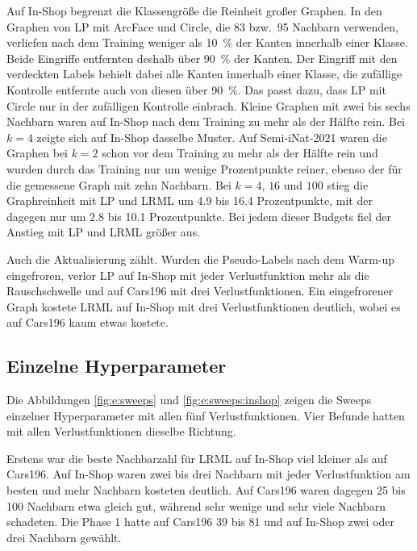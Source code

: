 Auf In-Shop begrenzt die Klassengröße die Reinheit großer Graphen. In den Graphen von \ac{LP} mit ArcFace und Circle, die 83 bzw.\ 95 Nachbarn verwenden, verliefen nach dem Training weniger als \qty{10}{\percent} der Kanten innerhalb einer Klasse. Beide Eingriffe entfernten deshalb über \qty{90}{\percent} der Kanten. Der Eingriff mit den verdeckten Labels behielt dabei alle Kanten innerhalb einer Klasse, die zufällige Kontrolle entfernte auch von diesen über \qty{90}{\percent}. Das passt dazu, dass \ac{LP} mit Circle nur in der zufälligen Kontrolle einbrach. Kleine Graphen mit zwei bis sechs Nachbarn waren auf In-Shop nach dem Training zu mehr als der Hälfte rein. Bei $k=4$ zeigte sich auf In-Shop dasselbe Muster. Auf Semi-iNat-2021 waren die Graphen bei $k=2$ schon vor dem Training zu mehr als der Hälfte rein und wurden durch das Training nur um wenige Prozentpunkte reiner, ebenso der für die \UEBL gemessene Graph mit zehn Nachbarn. Bei $k=4$, $16$ und $100$ stieg die Graphreinheit mit \ac{LP} und \ac{LRML} um \num{4.9} bis \num{16.4} Prozentpunkte, mit der \UEBL dagegen nur um \num{2.8} bis \num{10.1} Prozentpunkte. Bei jedem dieser Budgets fiel der Anstieg mit \ac{LP} und \ac{LRML} größer aus.

Auch die Aktualisierung zählt. Wurden die Pseudo-Labels nach dem Warm-up eingefroren, verlor \ac{LP} auf In-Shop mit jeder Verlustfunktion mehr als die Rauschschwelle und auf Cars196 mit drei Verlustfunktionen. Ein eingefrorener Graph kostete \ac{LRML} auf In-Shop mit drei Verlustfunktionen deutlich, wobei es auf Cars196 kaum etwas kostete.

\subsection{Einzelne Hyperparameter}
\label{sec:e:sweeps}  

Die Abbildungen \ref{fig:e:sweeps} und \ref{fig:e:sweeps:inshop} zeigen die Sweeps einzelner Hyperparameter mit allen fünf Verlustfunktionen. Vier Befunde hatten mit allen Verlustfunktionen dieselbe Richtung. 

Erstens war die beste Nachbarzahl für \ac{LRML} auf In-Shop viel kleiner als auf Cars196. Auf In-Shop waren zwei bis drei Nachbarn mit jeder Verlustfunktion am besten und mehr Nachbarn kosteten deutlich. Auf Cars196 waren dagegen 25 bis 100 Nachbarn etwa gleich gut, während sehr wenige und sehr viele Nachbarn schadeten. Die Phase 1 hatte auf Cars196 39 bis 81 und auf In-Shop zwei oder drei Nachbarn gewählt.

